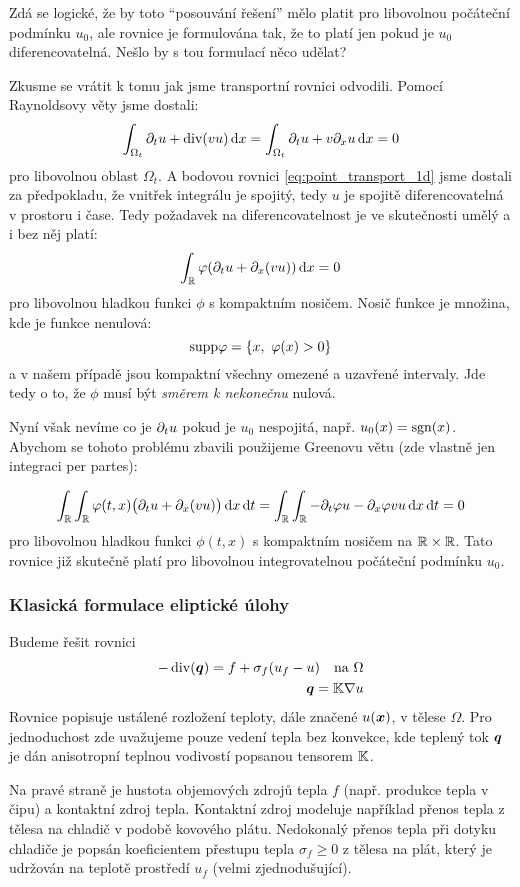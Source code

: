 Zdá se logické, že by toto ``posouvání řešení'' mělo platit pro libovolnou počáteční podmínku 
$u_0$, ale rovnice je formulována tak, že to platí jen pokud je $u_0$ diferencovatelná. 
Nešlo by s tou formulací něco udělat?

Zkusme se vrátit k tomu jak jsme transportní rovnici odvodili. Pomocí Raynoldsovy věty jsme dostali:
\[
    \int_{\Omega_t} \partial_t u + \operatorname{div}(v u) \,{\rm d} x= \int_{\Omega_t} \partial_t u + v\partial_x u \,{\rm d} x= 0
\]
pro libovolnou oblast $\Omega_t$. A bodovou rovnici \eqref{eq:point_transport_1d} 
jsme dostali za předpokladu, že vnitřek integrálu je spojitý, 
tedy $u$ je spojitě diferencovatelná v prostoru i čase. 
Tedy požadavek na diferencovatelnost je ve skutečnosti umělý a i bez něj platí:
\[
    \int_{\mathbb R} \varphi(\partial_t u + \partial_x(vu)) \,{\rm d} x = 0
\]
pro libovolnou hladkou funkci $\phi$ s kompaktním nosičem. 
Nosič funkce je množina, kde je funkce nenulová:
\[
    {\rm supp} \varphi = \{ x,\ \varphi(x) > 0\}
\]
a v našem případě jsou kompaktní všechny omezené a uzavřené intervaly. 
Jde tedy o to, že $\phi$ musí být \emph{směrem k nekonečnu} nulová.

Nyní však nevíme co je $\partial_t u$ pokud je $u_0$ nespojitá, 
např. $u_0(x)=\operatorname{sgn}(x)$. Abychom se tohoto problému zbavili použijeme Greenovu větu 
(zde vlastně jen integraci per partes):

\[
    \int_{\mathbb R} \int_{\mathbb R} \varphi(t,x)\big(\partial_t u + \partial_x(vu)\big) \,{\rm d} x \,{\rm d} t= 
    \int_{\mathbb R} \int_{\mathbb R} -\partial_t \varphi u - \partial_x \varphi vu \,{\rm d} x \,{\rm d} t = 0
\]
pro libovolnou hladkou funkci $\phi(t,x)$ s kompaktním nosičem na ${\mathbb R} \times {\mathbb R}$.
Tato rovnice již skutečně platí pro libovolnou integrovatelnou počáteční podmínku $u_0$.


\subsubsection{Klasická formulace eliptické úlohy}
\label{sec:weak_sol_elliptic_eq}
Budeme řešit rovnici
\begin{align}
   -\operatorname{div}(\mathbf{\boldsymbol{q}}) =f + \sigma_f(u_f - u) \quad\text{na }\Omega \\
   \mathbf{\boldsymbol{q}} = {\mathbb{K}}\nabla u
    \label{eq:elliptic}
\end{align}
Rovnice popisuje ustálené rozložení teploty, dále značené $u(\mathbf{\boldsymbol{x}})$, v tělese $\Omega$. 
Pro jednoduchost zde uvažujeme pouze vedení tepla bez konvekce, kde teplený tok $\mathbf{\boldsymbol{q}}$ je dán 
anisotropní teplnou vodivostí popsanou tensorem ${\mathbb{K}}$. 

Na pravé straně je hustota objemových zdrojů 
tepla $f$ (např. produkce tepla v čipu) a kontaktní zdroj tepla. 
Kontaktní zdroj modeluje například přenos tepla z tělesa na chladič v podobě kovového plátu.
Nedokonalý přenos tepla při dotyku chladiče je popsán koeficientem přestupu tepla $\sigma_f\ge 0$ 
z tělesa na plát, který je udržován na teplotě prostředí $u_f$ (velmi zjednodušující).


